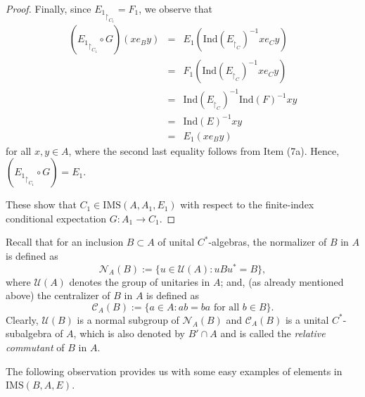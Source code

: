 \documentclass[a4]{amsart}
\numberwithin{equation}{section}
\newcommand{\mcal}{\mathcal}
\begin{document}
\begin{proof}
        Finally, since ${E_1}_{\restriction_{C_1}}= F_1$, we observe that
\begin{eqnarray*}
({E_1}_{\restriction_{C_1}} \circ G) (xe_By) & = &
  E_1(\mathrm{Ind}(E_{\restriction_{C}})^{-1} x e_C y )
  \\ & = &
F_1(\mathrm{Ind}(E_{\restriction_{C}})^{-1} x e_C y )
\\
& = & \mathrm{Ind}(E_{\restriction_{C}})^{-1} \mathrm{Ind}({F})^{-1} x y \\
& = &
\mathrm{Ind}({E})^{-1} x y\\
& = & E_1(xe_By)
\end{eqnarray*}
for all $x, y \in A$, where the second last equality follows from Item
(7a). Hence, $({E_1}_{\restriction_{C_1}} \circ G) = E_1$.

These show that $C_1 \in \mathrm{IMS}(A, A_1, E_1)$ with respect to the
finite-index conditional expectation $G: A_1 \to C_1$.  
\end{proof}



   Recall that for an inclusion $B \subset A$ of unital
   $C^*$-algebras, the normalizer of $B$ in $A$ is defined as
   \[
   \mathcal{N}_A(B):=\{ u \in \mathcal{U}(A): u B u^* = B\},
   \]
where $\mathcal{U}(A)$ denotes the group of unitaries in $A$; and, (as
already mentioned above) the centralizer
of $B$ in $A$ is defined as
   \[
   \mathcal{C}_A(B):=\{ a \in A: ab  =ba \text{ for all } b\in B\}.
   \]
   Clearly, $\mcal{U}(B)$ is a normal subgroup of $\mathcal{N}_A(B)$
   and $\mcal{C}_A(B)$ is a unital $C^*$-subalgebra of $A$, which is also
   denoted by $B'\cap A$ and is called the {\em relative commutant} of
   $B$ in $A$.\medskip



The following observation provides us with some easy examples of
elements in $\mathrm{IMS}(B,A,E)$.
\end{document}
